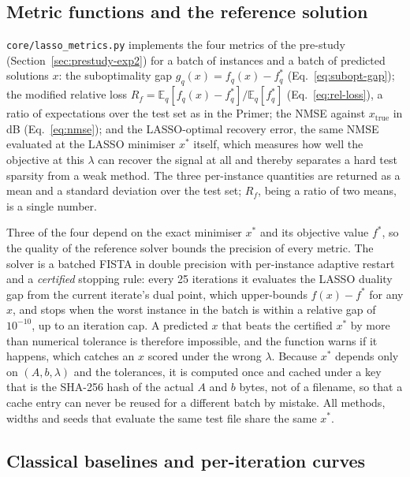 \subsection{Metric functions and the reference solution}

\texttt{core/lasso\_metrics.py} implements the four metrics of the
pre-study (Section~\ref{sec:prestudy-exp2}) for a batch of instances and a
batch of predicted solutions $x$:
the suboptimality gap $g_q(x) = f_q(x) - f_q^\ast$
(Eq.~\ref{eq:subopt-gap}); the modified relative loss
$R_{f} = \mathbb{E}_q[f_q(x) - f_q^\ast] / \mathbb{E}_q[f_q^\ast]$
(Eq.~\ref{eq:rel-loss}), a ratio of expectations over the test set as in the
Primer; the NMSE against $x_\mathrm{true}$ in dB (Eq.~\ref{eq:nmse}); and the
LASSO-optimal recovery error, the same NMSE evaluated at the LASSO minimiser
$x^\ast$ itself, which measures how well the objective at this $\lambda$ can
recover the signal at all and thereby separates a hard test sparsity from a
weak method. The three per-instance quantities are returned as a mean and a
standard deviation over the test set; $R_f$, being a ratio of two means, is a
single number.

Three of the four depend on the exact minimiser $x^\ast$ and its objective
value $f^\ast$, so the quality of the reference solver bounds the precision
of every metric. The solver is a batched FISTA in double precision with
per-instance adaptive restart~\cite{odonoghue2015restart} and a
\emph{certified} stopping rule: every 25 iterations it evaluates the LASSO
duality gap from the current iterate's dual point, which upper-bounds
$f(x) - f^\ast$ for any $x$, and stops when the worst instance in the batch
is within a relative gap of $10^{-10}$, up to an iteration cap. A predicted
$x$ that beats the certified $x^\ast$ by more than numerical tolerance is
therefore impossible, and the function warns if it happens, which catches an
$x$ scored under the wrong $\lambda$. Because $x^\ast$ depends only on
$(A, b, \lambda)$ and the tolerances, it is computed once and cached under a
key that is the SHA-256 hash of the actual $A$ and $b$ bytes, not of a
filename, so that a cache entry can never be reused for a different batch by
mistake. All methods, widths and seeds that evaluate the same test file share
the same $x^\ast$.

\subsection{Classical baselines and per-iteration curves}

